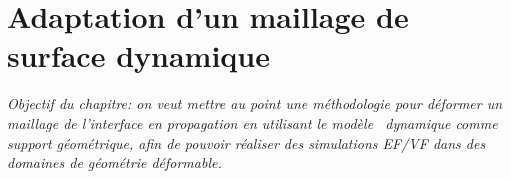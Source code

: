 \chapter{Adaptation d'un maillage de surface dynamique}


\textit{Objectif du chapitre: on veut mettre au point une méthodologie pour déformer un maillage de l'interface en propagation en utilisant le modèle \brep\ dynamique comme support géométrique, afin de pouvoir réaliser des simulations EF/VF dans des domaines de géométrie déformable.}



